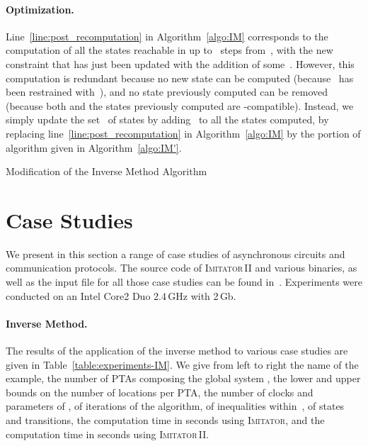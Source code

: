 \documentclass[submission,copyright,creativecommons]{eptcs}
\newcommand{\imitator}{\textsc{Imitator}}
\newcommand{\imitatordeux}{\textsc{Imitator}\,II}
\newcommand{\paragraphe}[1]{\paragraph{#1.}}
\begin{document}
\paragraphe{Optimization} \label{ss:optimizations}
Line~\ref{line:post_recomputation} in Algorithm~\ref{algo:IM} corresponds to the computation of all the states reachable in up to ~steps from~, with the new constraint  that has just been updated with the addition of some~.
However, this computation is redundant because no new state can be computed (because~ has been restrained with~), and no state previously computed can be removed (because both  and the states previously computed are -compatible).
Instead, we simply update the set~ of states by adding~ to all the states computed, by replacing line~\ref{line:post_recomputation} in Algorithm~\ref{algo:IM} by the portion of algorithm given in Algorithm~\ref{algo:IM'}.

\IncMargin{1em}
\begin{algorithm}[ht!]

\ForEach{}
{
	
}

\caption{Modification of the Inverse Method Algorithm}\label{algo:IM'}
\end{algorithm}\DecMargin{1em}









\section{Case Studies} \label{sec:experiments}


We present in this section a range of case studies of asynchronous circuits and communication protocols.
The source code of \imitatordeux{} and various binaries, as well as the input file for all those case studies can be found in~\cite{imitator2_web}.
Experiments were conducted on an Intel Core2 Duo 2.4\,GHz with 2\,Gb.



\paragraphe{Inverse Method}
The results of the application of the inverse method to various case studies are given in Table~\ref{table:experiments-IM}.
We give from left to right the name of the example, the number of PTAs composing the global system ,
the lower and upper bounds on the number of locations per PTA,
the number of clocks and parameters of ,
of iterations of the algorithm,
of inequalities within~,
of states and transitions,
the computation time in seconds using \imitator{},
and the computation time in seconds using \imitatordeux{}. 
\end{document}
